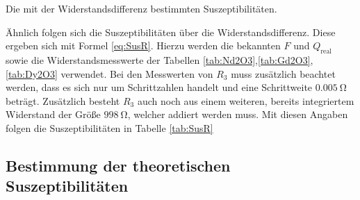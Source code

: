 \begin{table}
 \centering
 \caption{Die mit der Widerstandsdifferenz bestimmten Suszeptibilitäten.}
 
 \label{tab:SusR}
\end{table}


Ähnlich folgen sich die Suszeptibilitäten über die Widerstandsdifferenz. Diese ergeben sich mit Formel
\ref{eq:SusR}. Hierzu werden die bekannten $F$ und $Q_\text{real}$ sowie die Widerstandsmesswerte
der Tabellen \ref{tab:Nd2O3},\ref{tab:Gd2O3},\ref{tab:Dy2O3} verwendet.
Bei den Messwerten von $R_3$ muss zusätzlich beachtet werden, dass es sich nur
um Schrittzahlen handelt und eine Schrittweite $\SI{0.005}{\ohm}$ beträgt.
Zusätzlich besteht $R_3$ auch noch aus einem weiteren, bereits integriertem Widerstand
der Größe $\SI{998}{\ohm}$, welcher addiert werden muss. Mit diesen Angaben folgen die Suszeptibilitäten in Tabelle \ref{tab:SusR}

\subsection{Bestimmung der theoretischen Suszeptibilitäten}


